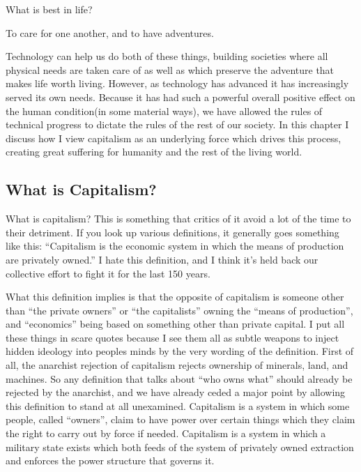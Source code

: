 What is best in life?

To care for one another, and to have adventures.

Technology can help us do both of these things, building societies where
all physical needs are taken care of as well as which preserve the
adventure that makes life worth living. However, as technology has
advanced it has increasingly served its own needs. Because it has had
such a powerful overall positive effect on the human condition(in some
material ways), we have allowed the rules of technical progress to
dictate the rules of the rest of our society. In this chapter I discuss
how I view capitalism as an underlying force which drives this process,
creating great suffering for humanity and the rest of the living world.

\subsection{What is Capitalism?}\label{what-is-capitalism}

What is capitalism? This is something that critics of it avoid a lot of
the time to their detriment. If you look up various definitions, it
generally goes something like this: ``Capitalism is the economic system
in which the means of production are privately owned.'' I hate this
definition, and I think it's held back our collective effort to fight it
for the last 150 years.

What this definition implies is that the opposite of capitalism is
someone other than ``the private owners'' or ``the capitalists'' owning
the ``means of production'', and ``economics'' being based on something
other than private capital. I put all these things in scare quotes
because I see them all as subtle weapons to inject hidden ideology into
peoples minds by the very wording of the definition. First of all, the
anarchist rejection of capitalism rejects ownership of minerals, land,
and machines. So any definition that talks about ``who owns what''
should already be rejected by the anarchist, and we have already ceded a
major point by allowing this definition to stand at all unexamined.
Capitalism is a system in which some people, called ``owners'', claim to
have power over certain things which they claim the right to carry out
by force if needed. Capitalism is a system in which a military state
exists which both feeds of the system of privately owned extraction and
enforces the power structure that governs it.

